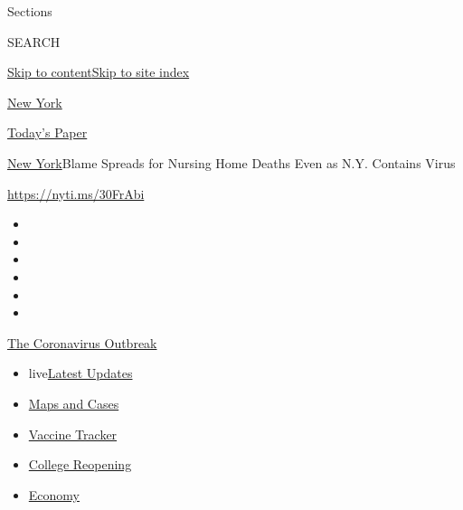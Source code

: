 Sections

SEARCH

\protect\hyperlink{site-content}{Skip to
content}\protect\hyperlink{site-index}{Skip to site index}

\href{https://www.nytimes.com/section/nyregion}{New York}

\href{https://myaccount.nytimes.com/auth/login?response_type=cookie\&client_id=vi}{}

\href{https://www.nytimes.com/section/todayspaper}{Today's Paper}

\href{/section/nyregion}{New York}\textbar{}Blame Spreads for Nursing
Home Deaths Even as N.Y. Contains Virus

\url{https://nyti.ms/30FrAbi}

\begin{itemize}
\item
\item
\item
\item
\item
\item
\end{itemize}

\href{https://www.nytimes.com/news-event/coronavirus?action=click\&pgtype=Article\&state=default\&region=TOP_BANNER\&context=storylines_menu}{The
Coronavirus Outbreak}

\begin{itemize}
\tightlist
\item
  live\href{https://www.nytimes.com/2020/08/04/world/coronavirus-covid-19.html?action=click\&pgtype=Article\&state=default\&region=TOP_BANNER\&context=storylines_menu}{Latest
  Updates}
\item
  \href{https://www.nytimes.com/interactive/2020/us/coronavirus-us-cases.html?action=click\&pgtype=Article\&state=default\&region=TOP_BANNER\&context=storylines_menu}{Maps
  and Cases}
\item
  \href{https://www.nytimes.com/interactive/2020/science/coronavirus-vaccine-tracker.html?action=click\&pgtype=Article\&state=default\&region=TOP_BANNER\&context=storylines_menu}{Vaccine
  Tracker}
\item
  \href{https://www.nytimes.com/2020/08/02/us/covid-college-reopening.html?action=click\&pgtype=Article\&state=default\&region=TOP_BANNER\&context=storylines_menu}{College
  Reopening}
\item
  \href{https://www.nytimes.com/live/2020/08/03/business/stock-market-today-coronavirus?action=click\&pgtype=Article\&state=default\&region=TOP_BANNER\&context=storylines_menu}{Economy}
\end{itemize}

